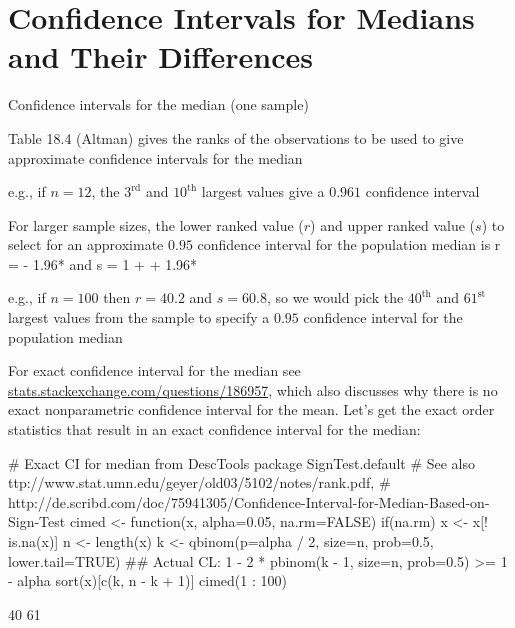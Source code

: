 \section{Confidence Intervals for Medians and Their Differences} 
\bi 
\item Confidence intervals for the median (one sample)
\bi 
\item Table 18.4 (Altman) gives the ranks of the observations to be
  used to give approximate confidence intervals for the median 
\item e.g., if $n = 12$, the $3^\textrm{rd}$ and $10^\textrm{th}$
  largest values give a $0.961$ confidence interval 
\item For larger sample sizes, the lower ranked value ($r$) and upper
  ranked value ($s$) to select for an approximate $0.95$ confidence
  interval for the population median is 
\beq
r =  - 1.96* \hspace{.4cm}\textrm{and}
\hspace{.4cm} s = 1 +  + 1.96* 
\eeq
\item e.g., if $n = 100$ then $r = 40.2$ and $s = 60.8$, so we would pick the $40^\textrm{th}$ and $61^\textrm{st}$ largest values from the sample to specify a $0.95$ confidence interval for the population median
\item For exact confidence interval for the median see\\
  \href{https://stats.stackexchange.com/questions/186957}{stats.stackexchange.com/questions/186957}, which
  also discusses why there is no exact nonparametric confidence
  interval for the mean.  Let's get the exact order statistics that result in an exact confidence interval for the median:
\begin{Schunk}
\begin{Sinput}
# Exact CI for median from DescTools package SignTest.default
# See also ttp://www.stat.umn.edu/geyer/old03/5102/notes/rank.pdf,
# http://de.scribd.com/doc/75941305/Confidence-Interval-for-Median-Based-on-Sign-Test
cimed <- function(x, alpha=0.05, na.rm=FALSE) {
  if(na.rm) x <- x[! is.na(x)]
  n <- length(x)
  k <- qbinom(p=alpha / 2, size=n, prob=0.5, lower.tail=TRUE)
  ## Actual CL: 1 - 2 * pbinom(k - 1, size=n, prob=0.5) >= 1 - alpha
  sort(x)[c(k, n - k + 1)]
}
cimed(1 : 100)
\end{Sinput}
\begin{Soutput}
[1] 40 61
\end{Soutput}
\end{Schunk}
